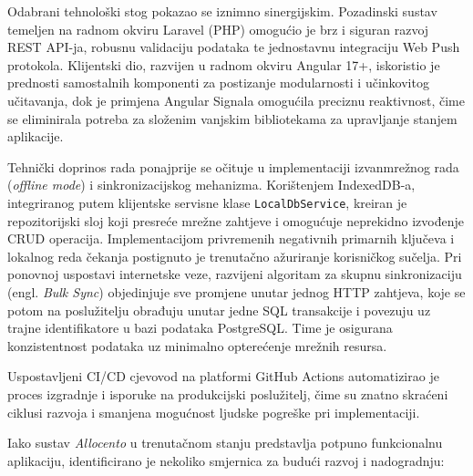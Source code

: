 \documentclass[a4paper,12pt,oneside]{article}
\begin{document}
	Odabrani tehnološki stog pokazao se iznimno sinergijskim. Pozadinski sustav temeljen na radnom okviru Laravel (PHP) omogućio je brz i siguran razvoj REST API-ja, robusnu validaciju podataka te jednostavnu integraciju Web Push protokola. Klijentski dio, razvijen u radnom okviru Angular 17+, iskoristio je prednosti samostalnih komponenti za postizanje modularnosti i učinkovitog učitavanja, dok je primjena Angular Signala omogućila preciznu reaktivnost, čime se eliminirala potreba za složenim vanjskim bibliotekama za upravljanje stanjem aplikacije.
	
	Tehnički doprinos rada ponajprije se očituje u implementaciji izvanmrežnog rada (\textit{offline mode}) i sinkronizacijskog mehanizma. Korištenjem IndexedDB-a, integriranog putem klijentske servisne klase \texttt{LocalDbService}, kreiran je repozitorijski sloj koji presreće mrežne zahtjeve i omogućuje neprekidno izvođenje CRUD operacija. Implementacijom privremenih negativnih primarnih ključeva i lokalnog reda čekanja postignuto je trenutačno ažuriranje korisničkog sučelja. Pri ponovnoj uspostavi internetske veze, razvijeni algoritam za skupnu sinkronizaciju (engl. \textit{Bulk Sync}) objedinjuje sve promjene unutar jednog HTTP zahtjeva, koje se potom na poslužitelju obrađuju unutar jedne SQL transakcije i povezuju uz trajne identifikatore u bazi podataka PostgreSQL. Time je osigurana konzistentnost podataka uz minimalno opterećenje mrežnih resursa.
	
	Uspostavljeni CI/CD cjevovod na platformi GitHub Actions automatizirao je proces izgradnje i isporuke na produkcijski poslužitelj, čime su znatno skraćeni ciklusi razvoja i smanjena mogućnost ljudske pogreške pri implementaciji.
	
	Iako sustav \textit{Allocento} u trenutačnom stanju predstavlja potpuno funkcionalnu aplikaciju, identificirano je nekoliko smjernica za budući razvoj i nadogradnju:
	
\end{document}
